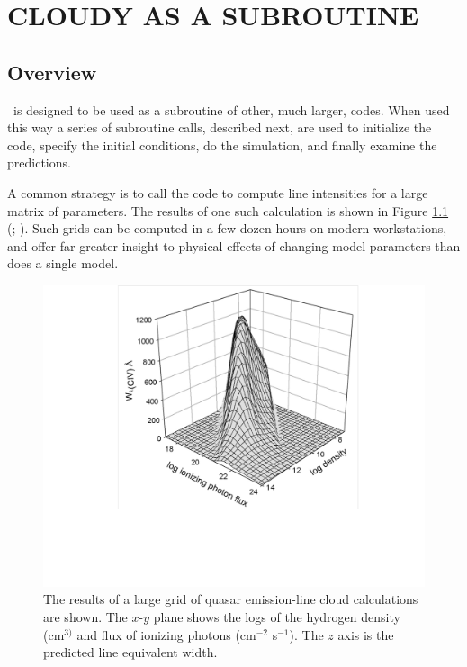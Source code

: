 \chapter{CLOUDY AS A SUBROUTINE}

\section{Overview}

\Cloudy\ is designed to be used as a subroutine of other, much larger,
codes.  When used this way a series of subroutine calls, described next,
are used to initialize the code, specify the initial conditions, do the
simulation, and finally examine the predictions.

A common strategy is to call the code to compute line intensities for
a large matrix of parameters.
The results of one such calculation is shown
in Figure \ref{fig:CIV_EW} (\citealp{Baldwin1995};
\citealp{Ferland2003}).
Such grids can be computed
in a few dozen hours on modern workstations, and offer far greater insight
to physical effects of changing model parameters than does a single model.

\begin{figure}
\centering
\includegraphics[scale=0.6]{CIV_EW}
\caption[C~IV equivalent width]{\label{fig:CIV_EW}The results of a large grid of quasar emission-line cloud
calculations are shown.  The $x$-$y$ plane shows the logs of the hydrogen density
(cm$^{3)}$ and flux of ionizing photons (cm$^{-2}$ s$^{-1}$).  The $z$ axis is the predicted
line equivalent width.}
\end{figure}

